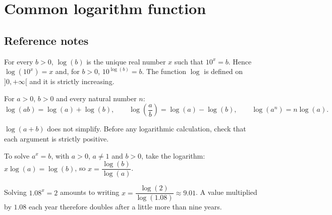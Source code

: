 
\chapter{Common logarithm function}
\section{Reference notes}
\begin{retenir}
For every $b>0$, $\log(b)$ is the unique real number $x$ such that $10^x=b$. Hence $\log(10^x)=x$ and, for $b>0$, $10^{\log(b)}=b$. The function $\log$ is defined on $]0,+\infty[$ and it is strictly increasing.
\end{retenir}

\begin{center}
\end{center}

For $a>0$, $b>0$ and every natural number $n$:
\[
\log(ab)=\log(a)+\log(b),\qquad
\log\!\left(\frac{a}{b}\right)=\log(a)-\log(b),\qquad
\log(a^n)=n\log(a).
\]

\begin{erreur}
$\log(a+b)$ does not simplify. Before any logarithmic calculation, check that each argument is strictly positive.
\end{erreur}

\begin{methode}
To solve $a^x=b$, with $a>0$, $a\neq1$ and $b>0$, take the logarithm: $x\log(a)=\log(b)$, so $x=\dfrac{\log(b)}{\log(a)}$.
\end{methode}

\begin{exemple}
Solving $1.08^x=2$ amounts to writing $x=\dfrac{\log(2)}{\log(1.08)}\approx9.01$. A value multiplied by $1.08$ each year therefore doubles after a little more than nine years.
\end{exemple}

